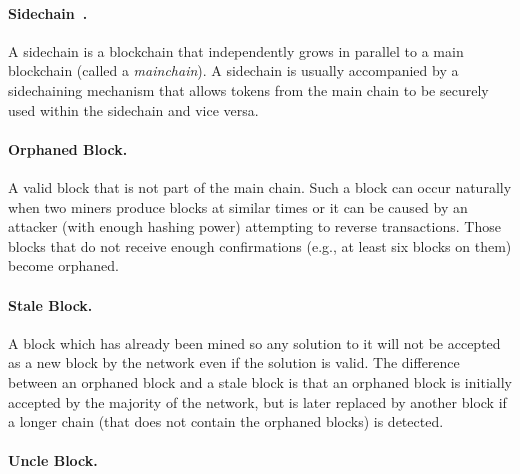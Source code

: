 \documentclass[11pt]{article}
\theoremstyle{mytheoremstyle}
\begin{document}
\paragraph{Sidechain~\cite{sidechains:2014}.} A sidechain is a blockchain that independently grows in parallel to a main blockchain (called a \emph{mainchain}). A sidechain is usually accompanied by a sidechaining mechanism that allows tokens from the main chain to be securely used within the sidechain and vice versa.

\paragraph{Orphaned Block.} A valid block that is not part of the main chain. Such a block can occur naturally when two miners produce blocks at similar times or it can be caused by an attacker (with enough hashing power) attempting to reverse transactions. Those blocks that do not receive enough confirmations (e.g., at least six blocks on them) become orphaned.

\paragraph{Stale Block.} A block which has already been mined so any solution to it will not be accepted as a new block by the network even if the solution is valid. The difference between an orphaned block and a stale block is that an orphaned block is initially accepted by the majority of the network, but is later replaced by another block if a longer chain (that does not contain the orphaned blocks) is detected.

\paragraph{Uncle Block.} 


\end{document}
